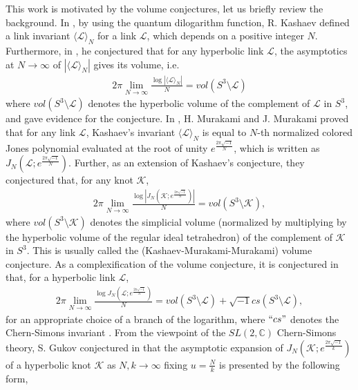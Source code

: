 \documentclass[12pt]{amsart}
\begin{document}
This work is motivated by the volume conjectures, let us briefly review the background.   In \cite{Kash95}, by using the quantum dilogarithm function, R. Kashaev defined a link invariant $\langle \mathcal{L} \rangle_{N}$  for a link $\mathcal{L}$, which depends on a positive integer $N$. Furthermore, in \cite{Kash97}, he conjectured that for any hyperbolic link $\mathcal{L}$, the asymptotics at $N\rightarrow \infty$ of $|\langle \mathcal{L}\rangle_N|$ gives its volume, i.e. 
 \begin{align}
     2\pi \lim_{N\rightarrow \infty}\frac{\log |\langle\mathcal{L}\rangle_N|}{N}=vol(S^3\setminus \mathcal{L})
 \end{align}
where $vol(S^3\setminus \mathcal{L})$ denotes the hyperbolic volume of the complement of $\mathcal{L}$ in $S^3$, and gave evidence for the conjecture. In  \cite{MuMu01}, H. Murakami and J. Murakami proved that for any link $\mathcal{L}$, Kashaev's invariant 
$\langle \mathcal{L}\rangle_N$ is equal to $N$-th normalized colored Jones polynomial  evaluated at the root of unity $e^{\frac{2\pi \sqrt{-1}}{N}}$, which is written as $J_{N}(\mathcal{L};e^{\frac{2\pi \sqrt{-1}}{N}})$. Further, as an extension of  Kashaev's conjecture, they conjectured that, for any knot $\mathcal{K}$,  
\begin{align} \label{formula-original-volume}
    2\pi \lim_{N\rightarrow \infty} \frac{\log |J_N(\mathcal{K}; e^{\frac{2\pi \sqrt{-1}}{N}})|}{N}=vol(S^3 \setminus \mathcal{K}),
\end{align}
where $vol(S^3\setminus \mathcal{K})$ denotes the simplicial volume (normalized by multiplying by the hyperbolic volume of the regular ideal tetrahedron) of the complement of $\mathcal{K}$ in $S^3$. This is usually called the (Kashaev-Murakami-Murakami) volume conjecture. As a complexification of the volume conjecture, it is conjectured in \cite{MMOTY02} that, for a hyperbolic link $\mathcal{L}$, 
    \begin{align}
    2\pi \lim_{N\rightarrow \infty} \frac{\log J_N(\mathcal{L};e^{\frac{2\pi \sqrt{-1}}{N}})}{N}=vol(S^3\setminus \mathcal{L})+\sqrt{-1}cs(S^3\setminus \mathcal{L}),
\end{align}
for an appropriate choice of a branch of the logarithm, where $``cs"$ denotes the Chern-Simons invariant \cite{Mey86}. 
From the viewpoint of the $SL(2,\mathbb{C})$ Chern-Simons theory, S. Gukov conjectured in \cite{Guk05} that the asymptotic expansion of $J_{N}(\mathcal{K};e^{\frac{2\pi\sqrt{-1}}{k}})$ of a hyperbolic knot $\mathcal{K}$ as $N,k\rightarrow \infty$ fixing $u=\frac{N}{k}$ is presented by the following form, 
\end{document}
